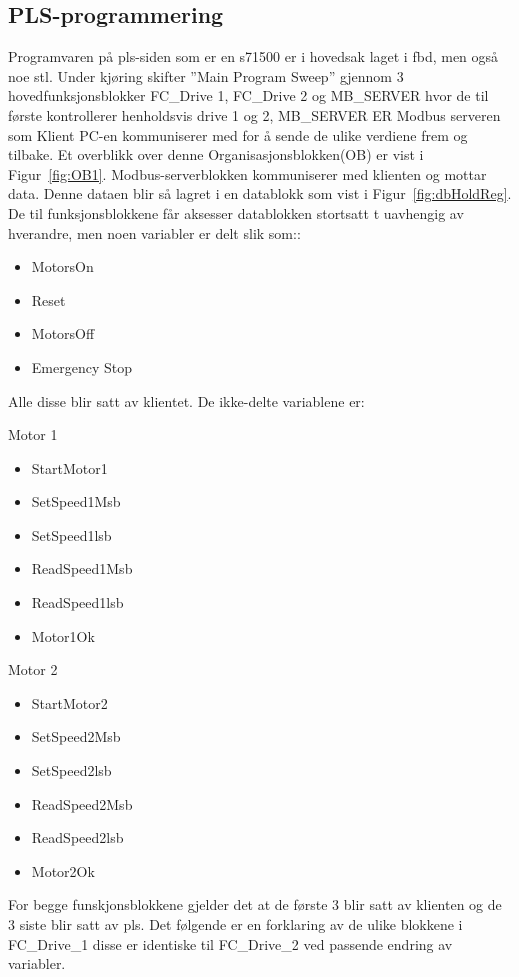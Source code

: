 \documentclass{ol-softwaremanual}
\newcommand{\figref}[1]{Figur~\ref{#1}}
\begin{document}
\subsection{PLS-programmering}
Programvaren på \acrshort{pls}-siden som er en \Gls{s71500} er i hovedsak laget i \acrshort{fbd}, men også noe \acrshort{stl}. Under kjøring skifter ''Main Program Sweep'' gjennom 3 hovedfunksjonsblokker FC\_Drive 1, FC\_Drive 2 og MB\_SERVER hvor de til første kontrollerer henholdsvis drive 1 og 2, MB\_SERVER ER Modbus serveren som Klient PC-en kommuniserer med for å sende de ulike verdiene frem og tilbake. Et overblikk over denne Organisasjonsblokken(OB)  er vist i \figref{fig:OB1}. Modbus-serverblokken kommuniserer med klienten og mottar data. Denne dataen blir så lagret i en datablokk som vist i   \figref{fig:dbHoldReg}. De til funksjonsblokkene får aksesser datablokken stortsatt t uavhengig av hverandre, men noen variabler er delt slik som::
\begin{itemize}
    \item MotorsOn
    \item Reset
    \item MotorsOff
    \item Emergency Stop
\end{itemize}
Alle disse blir satt av klientet. 
De ikke-delte variablene er:
\begin{multicols}{2}
Motor 1
\begin{itemize}
    \item StartMotor1
    \item SetSpeed1Msb
    \item SetSpeed1lsb
    \item ReadSpeed1Msb
    \item ReadSpeed1lsb
    \item Motor1Ok
\end{itemize}
Motor 2 
\begin{itemize}
    \item StartMotor2
    \item SetSpeed2Msb
    \item SetSpeed2lsb
    \item ReadSpeed2Msb
    \item ReadSpeed2lsb
    \item Motor2Ok
\end{itemize}
\end{multicols}
For begge funskjonsblokkene gjelder det at de første 3 blir satt av klienten og de 3 siste blir satt av \acrshort{pls}. 
Det følgende er en forklaring av de ulike blokkene i FC\_Drive\_1  disse er identiske til FC\_Drive\_2 ved passende endring av variabler. 
\end{document}
